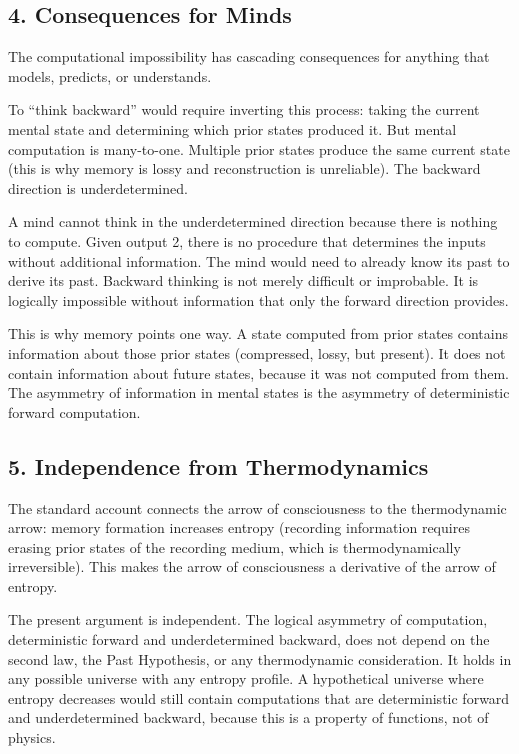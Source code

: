 \documentclass[
]{article}
\begin{document}
\subsection{4. Consequences for Minds}\label{consequences-for-minds}

The computational impossibility has cascading consequences for anything
that models, predicts, or understands.

To ``think backward'' would require inverting this process: taking the
current mental state and determining which prior states produced it. But
mental computation is many-to-one. Multiple prior states produce the
same current state (this is why memory is lossy and reconstruction is
unreliable). The backward direction is underdetermined.

A mind cannot think in the underdetermined direction because there is
nothing to compute. Given output 2, there is no procedure that
determines the inputs without additional information. The mind would
need to already know its past to derive its past. Backward thinking is
not merely difficult or improbable. It is logically impossible without
information that only the forward direction provides.

This is why memory points one way. A state computed from prior states
contains information about those prior states (compressed, lossy, but
present). It does not contain information about future states, because
it was not computed from them. The asymmetry of information in mental
states is the asymmetry of deterministic forward computation.

\subsection{5. Independence from
Thermodynamics}\label{independence-from-thermodynamics}

The standard account connects the arrow of consciousness to the
thermodynamic arrow: memory formation increases entropy (recording
information requires erasing prior states of the recording medium, which
is thermodynamically irreversible). This makes the arrow of
consciousness a derivative of the arrow of entropy.

The present argument is independent. The logical asymmetry of
computation, deterministic forward and underdetermined backward, does
not depend on the second law, the Past Hypothesis, or any thermodynamic
consideration. It holds in any possible universe with any entropy
profile. A hypothetical universe where entropy decreases would still
contain computations that are deterministic forward and underdetermined
backward, because this is a property of functions, not of physics.
\end{document}
